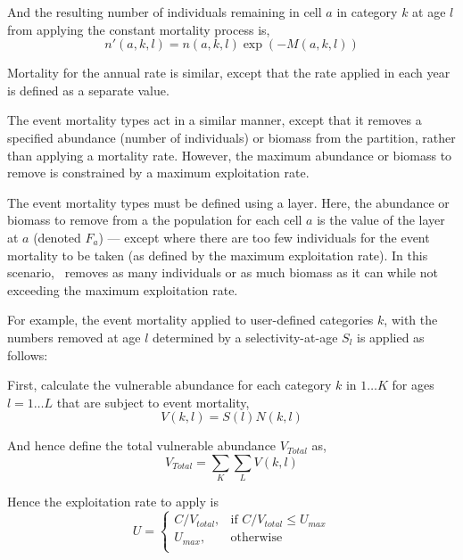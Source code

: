 And the resulting number of individuals remaining in cell $a$ in category $k$ at age $l$ from applying the constant mortality process is,
\begin{equation}
  n'(a,k,l) = n(a,k,l) \exp \left({-M(a,k,l)}\right)
\end{equation}

Mortality for the annual rate is similar, except that the rate applied in each year is defined as a separate value. 

The event mortality types act in a similar manner, except that it removes a specified abundance (number of individuals) or biomass from the partition, rather than applying a mortality rate. However, the maximum abundance or biomass to remove is constrained by a maximum exploitation rate.

The event mortality types must be defined using a layer. Here, the abundance or biomass to remove from a the population for each cell $a$ is the value of the layer at $a$ (denoted $F_a$) --- except where there are too few individuals for the event mortality to be taken (as defined by the maximum exploitation rate). In this scenario, \SPM\ removes as many individuals or as much biomass as it can while not exceeding the maximum exploitation rate.

For example, the event mortality applied to user-defined categories $k$, with the numbers removed at age $l$ determined by a selectivity-at-age $S_l$ is applied as follows:

First, calculate the vulnerable abundance for each category $k$ in $1 \ldots K$ for ages $l = 1 \ldots L$ that are subject to event mortality,
\begin{equation}
  V(k,l) = S(l) N(k,l)
\end{equation}

And hence define the total vulnerable abundance $V_{Total}$ as,
\begin{equation}
  V_{Total}  = \sum\limits_K {\sum\limits_L {V(k,l)}} 
\end{equation}

Hence the exploitation rate to apply is 
\begin{equation}
U = \begin{cases}
  C/V_{total}, & \text{if $C/V_{total} \leq U_{max}$} \\
  U_{max}, & \text{otherwise}\\ 
  \end{cases} 
\end{equation}

